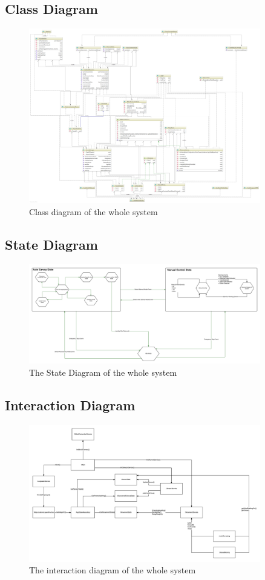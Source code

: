 \subsection{Class Diagram}
\begin{figure}
	\centering
	\includegraphics[width=0.9\textwidth]{ClassDiagram.png}	
	\caption{\label{fig:diagramClasses}Class diagram of the whole system}
\end{figure}	

\subsection{State Diagram}
\begin{figure}
	\centering
	\includegraphics[width=0.9\textwidth]{StateDiagram.png}	
	\caption{\label{fig:diagramState}The State Diagram of the whole system}
\end{figure}	

\subsection{Interaction Diagram}
\begin{figure}
	\centering
	\includegraphics[width=0.9\textwidth]{InteractionDiagram.png}	
	\caption{\label{fig:diagramInteraction}The interaction diagram of the whole system}
\end{figure}	